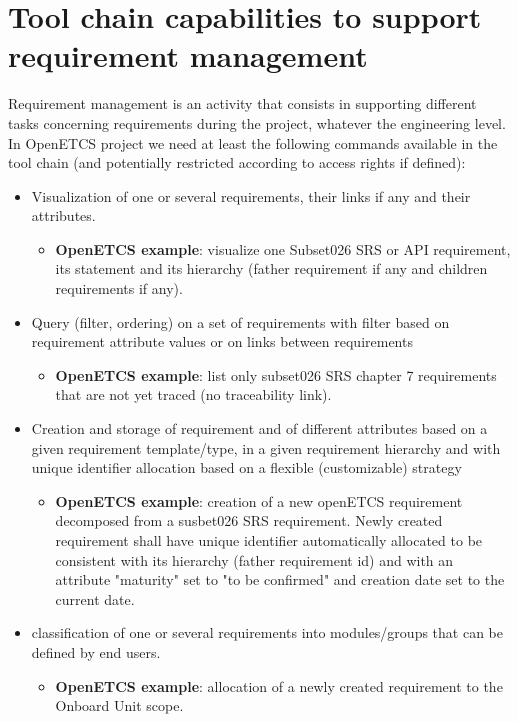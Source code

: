 \documentclass[11pt]{template/openetcs_report}
\begin{document}
\section{Tool chain capabilities to support requirement management}

Requirement management is an activity that consists in supporting different tasks concerning requirements during the project, whatever the engineering level. In OpenETCS project we need at least the following commands available in the tool chain (and potentially restricted according to access rights if defined):
\begin{itemize}

\item Visualization of one or several requirements, their links if any and their attributes. 
\begin{itemize} \item \textbf{OpenETCS example}: visualize one Subset026 SRS or API requirement, its statement and its hierarchy (father requirement if any and children requirements if any).\end{itemize}

\item Query (filter, ordering) on a set of requirements with filter based on requirement attribute values or on links between requirements
\begin{itemize} \item \textbf{OpenETCS example}: list only subset026 SRS chapter 7 requirements that are not yet traced (no traceability link).\end{itemize}

\item Creation and storage of requirement and of different attributes based on a given requirement template/type, in a given requirement hierarchy and with unique identifier allocation based on a flexible (customizable) strategy
\begin{itemize} \item \textbf{OpenETCS example}: creation of a new openETCS requirement decomposed from a susbet026 SRS requirement. Newly created requirement shall have unique identifier automatically allocated to be consistent with its hierarchy (father requirement id) and with an attribute "maturity" set to "to be confirmed" and creation date set to the current date.\end{itemize}

\item classification of one or several requirements into modules/groups that can be defined by end users.
\begin{itemize} \item \textbf{OpenETCS example}: allocation of a newly created requirement to the Onboard Unit scope.\end{itemize}


\end{itemize}
\end{document}
